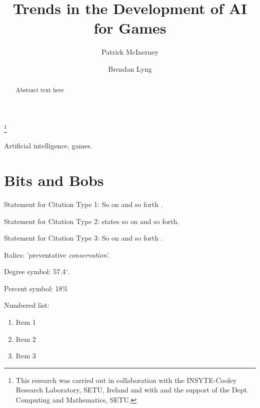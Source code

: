 \documentclass{ifacconf}
\begin{document}
\begin{frontmatter}

\title{Trends in the Development of AI for Games}

\thanks[footnoteinfo]{This research was carried out in collaboration with the INSYTE-Cooley Research Laboratory, SETU, Ireland and with and the support of the Dept. Computing and Mathematics, SETU.}

\author[First]{Patrick McInerney} 
\author[Second]{Brendan Lyng} 

\address[First]{Dept. Computing and Mathematics, SETU, Ireland (e-mail: patrick.mcinerney@setu.ie)}
\address[Second]{Dept. Computing and Mathematics, SETU, Ireland (e-mail: brendn.lyng@setu.ie)}

\begin{abstract}                %
Abstract text here
\end{abstract}

\begin{keyword}
Artificial intelligence, games.
\end{keyword}

\end{frontmatter}

\section{Bits and Bobs}

Statement for Citation Type 1: So on and so forth \citep{Morris:2022}.
 
Statement for Citation Type 2: \cite{Garca2018} states so on and so forth. 

Statement for Citation Type 3: So on and so forth \citep*{CDWA}.

Italics: 'preventative \textit{conservation}'.

Degree symbol: 57.4$^\circ$.

Percent symbol: 18\%

Numbered list:

\begin{enumerate}
	\item Item 1
	\item Item 2
	\item Item 3
\end{enumerate}
\end{document}
